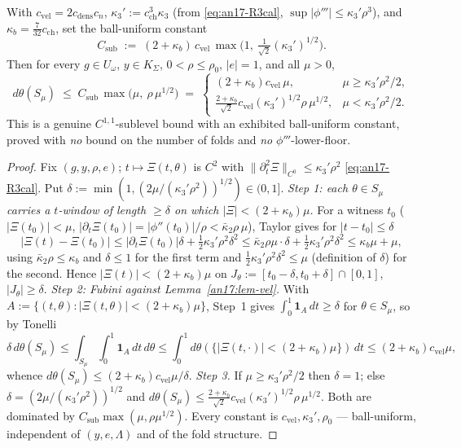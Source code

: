 \begin{theorem}\label{an17:thm-Csub}
With $c_{\mathrm{vel}}=2c_{\mathrm{dens}}c_n$, $\kappa_3':=c_{\mathrm{ch}}^3
\kappa_3$ {\rm(}from \eqref{eq:an17-R3cal}, $\sup|\phi'''|\le\kappa_3'\rho^3${\rm)},
and $\kappa_b=\tfrac7{32}c_{\mathrm{ch}}$, set the ball-uniform constant
\begin{equation}\label{eq:an17-Csub}
 C_{\mathrm{sub}}\;:=\;(2+\kappa_b)\,c_{\mathrm{vel}}\,
 \max\!\bigl(1,\ \tfrac1{\sqrt2}(\kappa_3')^{1/2}\bigr).
\end{equation}
Then for every $g\in U_\omega$, $y\in K_\Sigma$, $0<\rho\le\rho_0$, $|e|=1$, and
all $\mu>0$,
\begin{equation}\label{eq:an17-sublevel}
 d\theta(S_\mu)\;\le\;C_{\mathrm{sub}}\,\max\!\bigl(\mu,\ \rho\,\mu^{1/2}\bigr)
 \;=\;\begin{cases}
 (2+\kappa_b)c_{\mathrm{vel}}\,\mu, & \mu\ge\kappa_3'\rho^2/2,\\[2pt]
 \tfrac{2+\kappa_b}{\sqrt2}c_{\mathrm{vel}}(\kappa_3')^{1/2}\rho\,\mu^{1/2},
 & \mu<\kappa_3'\rho^2/2.
 \end{cases}
\end{equation}
This is a genuine $C^{1,1}$-sublevel bound with an exhibited ball-uniform
constant, proved with \emph{no} bound on the number of folds and \emph{no}
$\phi'''$-lower-floor.
\end{theorem}
\begin{proof}
Fix $(g,y,\rho,e)$; $t\mapsto\Xi(t,\theta)$ is $C^2$ with
$\|\partial_t^2\Xi\|_{C^0}\le\kappa_3'\rho^2$ \eqref{eq:an17-R3cal}. Put
$\delta:=\min(1,(2\mu/(\kappa_3'\rho^2))^{1/2})\in(0,1]$. \emph{Step 1: each
$\theta\in S_\mu$ carries a $t$-window of length $\ge\delta$ on which
$|\Xi|<(2+\kappa_b)\mu$.} For a witness $t_0$ ($|\Xi(t_0)|<\mu$,
$|\partial_t\Xi(t_0)|=|\phi''(t_0)|/\rho<\bar\kappa_2\rho\,\mu$), Taylor gives for
$|t-t_0|\le\delta$
\[
 |\Xi(t)-\Xi(t_0)|\le|\partial_t\Xi(t_0)|\delta+\tfrac12\kappa_3'\rho^2\delta^2
 \le\bar\kappa_2\rho\mu\cdot\delta+\tfrac12\kappa_3'\rho^2\delta^2
 \le\kappa_b\mu+\mu,
\]
using $\bar\kappa_2\rho\le\kappa_b$ and $\delta\le1$ for the first term and
$\tfrac12\kappa_3'\rho^2\delta^2\le\mu$ (definition of $\delta$) for the second.
Hence $|\Xi(t)|<(2+\kappa_b)\mu$ on $J_\theta:=[t_0-\delta,t_0+\delta]\cap[0,1]$,
$|J_\theta|\ge\delta$. \emph{Step 2: Fubini against
Lemma~\ref{an17:lem-vel}.} With $A:=\{(t,\theta):|\Xi(t,\theta)|<(2+\kappa_b)\mu\}$,
Step~1 gives $\int_0^1\mathbf 1_A\,dt\ge\delta$ for $\theta\in S_\mu$, so by
Tonelli
\[
 \delta\, d\theta(S_\mu)\le\int_{S_\mu}\!\!\int_0^1\mathbf 1_A\,dt\,d\theta
 \le\int_0^1 d\theta(\{|\Xi(t,\cdot)|<(2{+}\kappa_b)\mu\})\,dt
 \le(2+\kappa_b)c_{\mathrm{vel}}\mu,
\]
whence $d\theta(S_\mu)\le(2+\kappa_b)c_{\mathrm{vel}}\mu/\delta$. \emph{Step 3.}
If $\mu\ge\kappa_3'\rho^2/2$ then $\delta=1$; else $\delta=(2\mu/(\kappa_3'
\rho^2))^{1/2}$ and $d\theta(S_\mu)\le\tfrac{2+\kappa_b}{\sqrt2}c_{\mathrm{vel}}
(\kappa_3')^{1/2}\rho\,\mu^{1/2}$. Both are dominated by
$C_{\mathrm{sub}}\max(\mu,\rho\mu^{1/2})$. Every constant is
$c_{\mathrm{vel}},\kappa_3',\rho_0$ --- ball-uniform, independent of $(y,e,\Lambda)$
and of the fold structure.
\end{proof}

